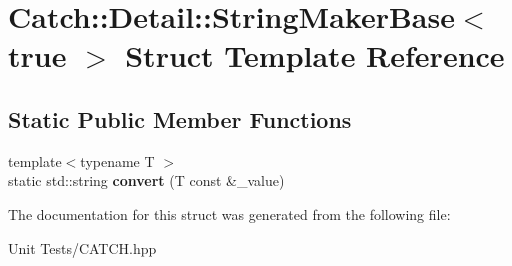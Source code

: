\hypertarget{structCatch_1_1Detail_1_1StringMakerBase_3_01true_01_4}{}\section{Catch\+:\+:Detail\+:\+:String\+Maker\+Base$<$ true $>$ Struct Template Reference}
\label{structCatch_1_1Detail_1_1StringMakerBase_3_01true_01_4}
\subsection*{Static Public Member Functions}
\begin{DoxyCompactItemize}
\item 
{\footnotesize template$<$typename T $>$ }\\static std\+::string {\bfseries convert} (T const \&\+\_\+value)\hypertarget{structCatch_1_1Detail_1_1StringMakerBase_3_01true_01_4_af9b5fdf7fddd8c5c873caa819e5f00f6}{}\label{structCatch_1_1Detail_1_1StringMakerBase_3_01true_01_4_af9b5fdf7fddd8c5c873caa819e5f00f6}

\end{DoxyCompactItemize}


The documentation for this struct was generated from the following file\+:\begin{DoxyCompactItemize}
\item 
Unit Tests/C\+A\+T\+C\+H.\+hpp\end{DoxyCompactItemize}
